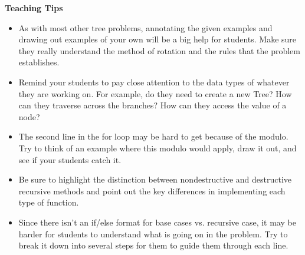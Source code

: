 \begin{blocksection}
\begin{guide}
\textbf{Teaching Tips}
\begin{itemize}
	\item As with most other tree problems, annotating the given examples and drawing out examples of your own will be a big help for students. Make sure they really understand the method of rotation and the rules that the problem establishes.
	\item Remind your students to pay close attention to the data types of whatever they are working on. For example, do they need to create a new Tree? How can they traverse across the branches? How can they access the value of a node?
	\item The second line in the for loop may be hard to get because of the modulo. Try to think of an example where this modulo would apply, draw it out, and see if your students catch it.
	\item Be sure to highlight the distinction between nondestructive and destructive recursive methods and point out the key differences in implementing each type of function.
	\item Since there isn't an if/else format for base cases vs. recursive case, it may be harder for students to understand what is going on in the problem. Try to break it down into several steps for them to guide them through each line.
\end{itemize}
\end{guide}
\end{blocksection}